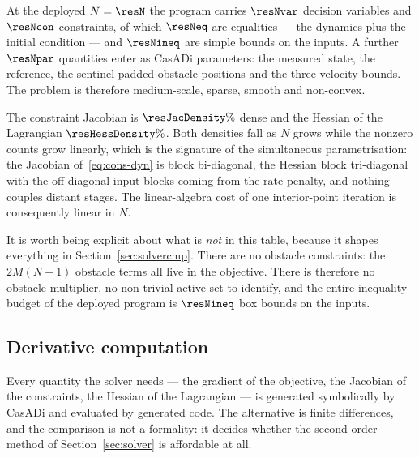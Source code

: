 \documentclass[11pt,a4paper]{article}
\begin{document}
At the deployed $N=\resN$ the program carries $\resNvar$ decision variables and $\resNcon$ constraints, of
which $\resNeq$ are equalities --- the dynamics plus the initial condition --- and $\resNineq$ are simple
bounds on the inputs. A further $\resNpar$ quantities enter as CasADi parameters: the measured state, the
reference, the sentinel-padded obstacle positions and the three velocity bounds. The problem is therefore
medium-scale, sparse, smooth and non-convex.

The constraint Jacobian is $\resJacDensity\%$ dense and the Hessian of the Lagrangian $\resHessDensity\%$.
Both densities fall as $N$ grows while the nonzero counts grow linearly, which is the signature of the
simultaneous parametrisation: the Jacobian of~\eqref{eq:cons-dyn} is block bi-diagonal, the Hessian block
tri-diagonal with the off-diagonal input blocks coming from the rate penalty, and nothing couples distant
stages. The linear-algebra cost of one interior-point iteration is consequently linear in $N$.

It is worth being explicit about what is \emph{not} in this table, because it shapes everything in
Section~\ref{sec:solvercmp}. There are no obstacle constraints: the $2M(N+1)$ obstacle terms all live in the
objective. There is therefore no obstacle multiplier, no non-trivial active set to identify, and the entire
inequality budget of the deployed program is $\resNineq$ box bounds on the inputs.

\subsection{Derivative computation}
\label{sec:deriv}

Every quantity the solver needs --- the gradient of the objective, the Jacobian of the constraints, the
Hessian of the Lagrangian --- is generated symbolically by CasADi and evaluated by generated code. The
alternative is finite differences, and the comparison is not a formality: it decides whether the second-order
method of Section~\ref{sec:solver} is affordable at all.

\begin{table}[htbp]
  \centering
  \small
  \caption{%
  Accuracy of the finite-difference gradient against the step size, measured against the AD gradient. The
  optimum sits at $h=1.49\times 10^{-8}$ one-sided (theory: $\sqrt{\varepsilon}=1.49\times 10^{-8}$) and
  $h=6.06\times 10^{-6}$ central (theory: $\varepsilon^{1/3}=6.06\times 10^{-6}$).}
  \label{res:tab:fd}
\end{table}
\end{document}
